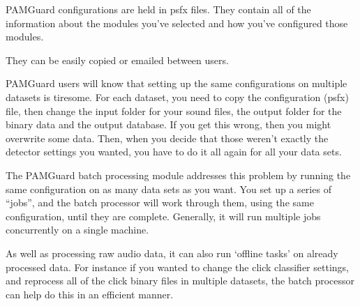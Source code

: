 \documentclass[
]{article}
\begin{document}
\begin{tcolorbox}[enhanced jigsaw, left=2mm, coltitle=black, colback=white, colbacktitle=quarto-callout-tip-color!10!white, opacitybacktitle=0.6, colframe=quarto-callout-tip-color-frame, opacityback=0, toprule=.15mm, title=\textcolor{quarto-callout-tip-color}{\faLightbulb}\hspace{0.5em}{PAMGuard configuration files}, breakable, bottomtitle=1mm, toptitle=1mm, bottomrule=.15mm, titlerule=0mm, leftrule=.75mm, arc=.35mm, rightrule=.15mm]

PAMGuard configurations are held in psfx files. They contain all of the
information about the modules you've selected and how you've configured
those modules.

They can be easily copied or emailed between users.

\end{tcolorbox}

PAMGuard users will know that setting up the same configurations on
multiple datasets is tiresome. For each dataset, you need to copy the
configuration (psfx) file, then change the input folder for your sound
files, the output folder for the binary data and the output database. If
you get this wrong, then you might overwrite some data. Then, when you
decide that those weren't exactly the detector settings you wanted, you
have to do it all again for all your data sets.

The PAMGuard batch processing module addresses this problem by running
the same configuration on as many data sets as you want. You set up a
series of ``jobs'', and the batch processor will work through them,
using the same configuration, until they are complete. Generally, it
will run multiple jobs concurrently on a single machine.

As well as processing raw audio data, it can also run `offline tasks' on
already processed data. For instance if you wanted to change the click
classifier settings, and reprocess all of the click binary files in
multiple datasets, the batch processor can help do this in an efficient
manner.
\end{document}
